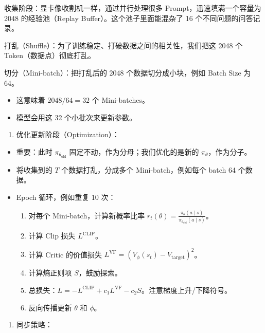 收集阶段：显卡像收割机一样，通过并行处理很多 Prompt，迅速填满一个容量为 2048 的经验池（Replay Buffer）。这个池子里面能混杂了 16 个不同问题的问答记录。

打乱（Shuffle）：为了训练稳定、打破数据之间的相关性，我们把这 2048 个 Token（数据点）彻底打乱。

切分（Mini-batch）：把打乱后的 2048 个数据切分成小块，例如 Batch Size 为 64。

\begin{itemize}
\tightlist
\item
  这意味着 \(2048 / 64 = 32\) 个 Mini-batches。
\item
  模型会用这 32 个小批次来更新参数。
\end{itemize}

\begin{enumerate}
\def\labelenumi{\arabic{enumi}.}
\setcounter{enumi}{2}
\tightlist
\item
  优化更新阶段（Optimization）：
\end{enumerate}

\begin{itemize}
\tightlist
\item
  重要：此时 \(\pi_{\theta_{\mathrm{old}}}\) 固定不动，作为分母；我们优化的是新的 \(\pi_\theta\)，作为分子。
\item
  将收集到的 \(T\) 个数据打乱，分成多个 Mini-batch，例如每个 batch 64 个数据。
\item
  Epoch 循环，例如重复 10 次：

  \begin{enumerate}
  \def\labelenumi{\arabic{enumi}.}
  \tightlist
  \item
    对每个 Mini-batch，计算新概率比率 \(r_t(\theta)=\frac{\pi_\theta(a \mid s)}{\pi_{\theta_{\mathrm{old}}}(a \mid s)}\)。
  \item
    计算 Clip 损失 \(L^{\mathrm{CLIP}}\)。
  \item
    计算 Critic 的价值损失 \(L^{\mathrm{VF}} = (V_\phi(s_t) - V_{\mathrm{target}})^2\)。
  \item
    计算熵正则项 \(S\)，鼓励探索。
  \item
    总损失：\(L = -L^{\mathrm{CLIP}} + c_1 L^{\mathrm{VF}} - c_2 S\)。注意梯度上升/下降符号。
  \item
    反向传播更新 \(\theta\) 和 \(\phi\)。
  \end{enumerate}
\end{itemize}

\begin{enumerate}
\def\labelenumi{\arabic{enumi}.}
\setcounter{enumi}{3}
\tightlist
\item
  同步策略：
\end{enumerate}

